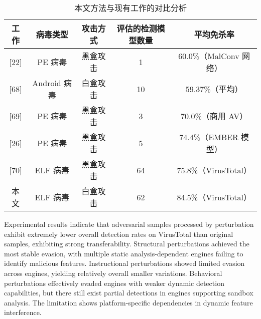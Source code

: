 %
%
%
%

\begin{conclusion}

\begin{table}[htbp]
	\centering
	\caption{本文方法与现有工作的对比分析}
	\label{tab:5.14}
	\begin{tabular*}{\textwidth}{@{\extracolsep{\fill}}ccccc}
		\toprule
		工作 & 病毒类型 & 攻击方式 & 评估的检测模型数量 & 平均免杀率 \\
		\midrule
		{[22]} & PE 病毒 & 黑盒攻击 & 1 & 60.0\%（MalConv 网络） \\
		{[68]} & Android 病毒 & 白盒攻击 & 10 & 59.37\%（平均） \\
		{[69]} & PE 病毒 & 黑盒攻击 & 3 & 70.0\%（商用 AV） \\
		{[26]} & PE 病毒 & 黑盒攻击 & 5 & 74.4\%（EMBER 模型） \\
		{[70]} & ELF 病毒 & 黑盒攻击 & 64 & 75.8\%（VirusTotal） \\
		本文 & ELF 病毒 & 白盒攻击 & 62 & 84.5\%（VirusTotal） \\
		\bottomrule
	\end{tabular*}
\end{table}

Experimental results indicate that adversarial samples processed by perturbation exhibit extremely lower overall detection rates on VirusTotal than original samples, exhibiting strong transferability. Structural perturbations achieved the most stable evasion, with multiple static analysis-dependent engines failing to identify malicious features. Instructional perturbations showed limited evasion across engines, yielding relatively overall smaller variations. Behavioral perturbations effectively evaded engines with weaker dynamic detection capabilities, but there still exist partial detections in engines supporting sandbox analysis. The limitation shows platform-specific dependencies in dynamic feature interference.


\end{conclusion}
